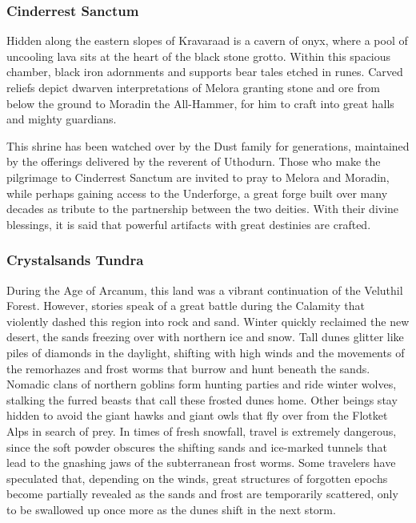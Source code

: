 \documentclass[10pt,a4paper,twoside,bg=print,twocolumn,openany,nodeprecatedcode]{dndbook}
\begin{document}
\subsubsection{Cinderrest Sanctum}
Hidden along the eastern slopes of Kravaraad is a cavern of onyx, where a pool of uncooling lava sits at the heart of the black stone grotto. Within this spacious chamber, black iron adornments and supports bear tales etched in runes. Carved reliefs depict dwarven interpretations of Melora granting stone and ore from below the ground to Moradin the All-Hammer, for him to craft into great halls and mighty guardians.

This shrine has been watched over by the Dust family for generations, maintained by the offerings delivered by the reverent of Uthodurn. Those who make the pilgrimage to Cinderrest Sanctum are invited to pray to Melora and Moradin, while perhaps gaining access to the Underforge, a great forge built over many decades as tribute to the partnership between the two deities. With their divine blessings, it is said that powerful artifacts with great destinies are crafted.

\subsubsection{Crystalsands Tundra}
During the Age of Arcanum, this land was a vibrant continuation of the Veluthil Forest. However, stories speak of a great battle during the Calamity that violently dashed this region into rock and sand. Winter quickly reclaimed the new desert, the sands freezing over with northern ice and snow. Tall dunes glitter like piles of diamonds in the daylight, shifting with high winds and the movements of the remorhazes and frost worms that burrow and hunt beneath the sands. Nomadic clans of northern goblins form hunting parties and ride winter wolves, stalking the furred beasts that call these frosted dunes home. Other beings stay hidden to avoid the giant hawks and giant owls that fly over from the Flotket Alps in search of prey. In times of fresh snowfall, travel is extremely dangerous, since the soft powder obscures the shifting sands and ice-marked tunnels that lead to the gnashing jaws of the subterranean frost worms. Some travelers have speculated that, depending on the winds, great structures of forgotten epochs become partially revealed as the sands and frost are temporarily scattered, only to be swallowed up once more as the dunes shift in the next storm.
\end{document}
